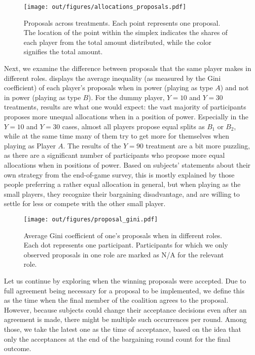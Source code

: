 \begin{figure}
    \centering
    \texttt{[image: out/figures/allocations\_proposals.pdf]}
    \caption{Proposals across treatments. Each point represents one proposal. The location of the point within the simplex indicates the shares of each player from the total amount distributed, while the color signifies the total amount.}
    \label{fig:allocations_proposals}
\end{figure}

Next, we examine the difference between proposals that the same player makes in different roles.  displays the average inequality (as measured by the Gini coefficient) of each player's proposals when in power (playing as type $A$) and not in power (playing as type $B$). For the dummy player, $Y=10$ and $Y=30$ treatments, results are what one would expect: the vast majority of participants proposes more unequal allocations when in a position of power. Especially in the $Y=10$ and $Y=30$ cases, almost all players propose equal splits as $B_1$ or $B_2$, while at the same time many of them try to get more for themselves when playing as Player $A$. The results of the $Y=90$ treatment are a bit more puzzling, as there are a significant number of participants who propose more equal allocations when in positions of power. Based on subjects' statements about their own strategy from the end-of-game survey, this is mostly explained by those people preferring a rather equal allocation in general, but when playing as the small players, they recognize their bargaining disadvantage, and are willing to settle for less or compete with the other small player.

\begin{figure}
    \centering
    \texttt{[image: out/figures/proposal\_gini.pdf]}
    \caption{Average Gini coefficient of one's proposals when in different roles. Each dot represents one participant. Participants for which we only observed proposals in one role are marked as N/A for the relevant role.}
    \label{fig:proposals_gini}
\end{figure}

Let us continue by exploring when the winning proposals were accepted. Due to full agreement being necessary for a proposal to be implemented, we define this as the time when the final member of the coalition agrees to the proposal. However, because subjects could change their acceptance decisions even after an agreement is made, there might be multiple such occurrences per round. Among those, we take the latest one as the time of acceptance, based on the idea that only the acceptances at the end of the bargaining round count for the final outcome.

